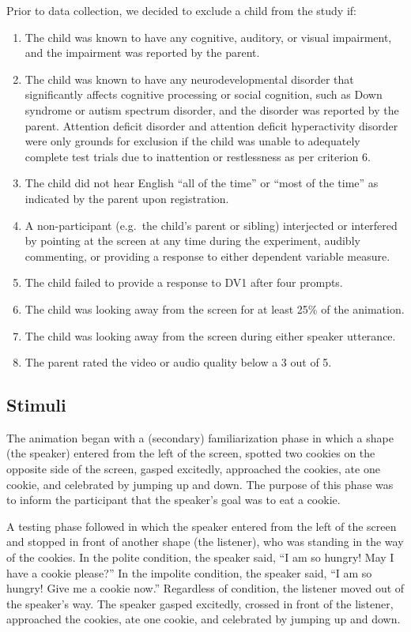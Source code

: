 \documentclass[
  english,
  man,floatsintext]{apa6}
\begin{document}
Prior to data collection, we decided to exclude a child from the study if:

\begin{enumerate}
\def\labelenumi{\arabic{enumi}.}
\item
  The child was known to have any cognitive, auditory, or visual impairment, and the impairment was reported by the parent.
\item
  The child was known to have any neurodevelopmental disorder that significantly affects cognitive processing or social cognition, such as Down syndrome or autism spectrum disorder, and the disorder was reported by the parent. Attention deficit disorder and attention deficit hyperactivity disorder were only grounds for exclusion if the child was unable to adequately complete test trials due to inattention or restlessness as per criterion 6.
\item
  The child did not hear English ``all of the time'' or ``most of the time'' as indicated by the parent upon registration.
\item
  A non-participant (e.g.~the child's parent or sibling) interjected or interfered by pointing at the screen at any time during the experiment, audibly commenting, or providing a response to either dependent variable measure.
\item
  The child failed to provide a response to DV1 after four prompts.
\item
  The child was looking away from the screen for at least 25\% of the animation.
\item
  The child was looking away from the screen during either speaker utterance.
\item
  The parent rated the video or audio quality below a 3 out of 5.
\end{enumerate}

\hypertarget{stimuli}{%
\subsection{Stimuli}\label{stimuli}}

The animation began with a (secondary) familiarization phase in which a shape (the speaker) entered from the left of the screen, spotted two cookies on the opposite side of the screen, gasped excitedly, approached the cookies, ate one cookie, and celebrated by jumping up and down. The purpose of this phase was to inform the participant that the speaker's goal was to eat a cookie.

A testing phase followed in which the speaker entered from the left of the screen and stopped in front of another shape (the listener), who was standing in the way of the cookies. In the polite condition, the speaker said, ``I am so hungry! May I have a cookie please?'' In the impolite condition, the speaker said, ``I am so hungry! Give me a cookie now.'' Regardless of condition, the listener moved out of the speaker's way. The speaker gasped excitedly, crossed in front of the listener, approached the cookies, ate one cookie, and celebrated by jumping up and down.
\end{document}
